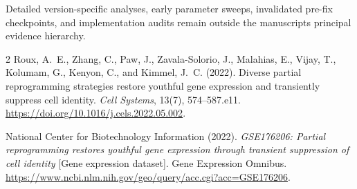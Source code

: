 \documentclass[10pt,twocolumn]{article}
\begin{document}
Detailed version-specific analyses, early parameter sweeps, invalidated pre-fix checkpoints, and implementation audits remain outside the manuscript\textquotesingle s principal evidence hierarchy.

\FloatBarrier
\begin{thebibliography}{2}
Roux, A.~E., Zhang, C., Paw, J., Zavala-Solorio, J., Malahias, E., Vijay, T., Kolumam, G., Kenyon, C., and Kimmel, J.~C. (2022).
Diverse partial reprogramming strategies restore youthful gene expression and transiently suppress cell identity.
\textit{Cell Systems}, 13(7), 574--587.e11. \url{https://doi.org/10.1016/j.cels.2022.05.002}.

National Center for Biotechnology Information (2022).
\textit{GSE176206: Partial reprogramming restores youthful gene expression through transient suppression of cell identity} [Gene expression dataset].
Gene Expression Omnibus. \url{https://www.ncbi.nlm.nih.gov/geo/query/acc.cgi?acc=GSE176206}.
\end{thebibliography}
\end{document}
